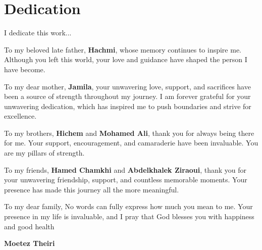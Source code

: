 \chapter*{Dedication }

\begin{center}

\begin{minipage}[c]{1\columnwidth}

{\large 
\vskip0.25cm

\centering

\begin{large}
I dedicate this work...

\vspace{0.5cm}

To my beloved late father, \textbf{Hachmi}, whose memory continues to inspire me. Although you left this world, your love and guidance have shaped the person I have become.

\vspace{0.5cm}

To my dear mother, \textbf{Jamila}, your unwavering love, support, and sacrifices have been a source of strength throughout my journey. I am forever grateful for your unwavering dedication, which has inspired me to push boundaries and strive for excellence.

\vspace{0.5cm}

To my brothers, \textbf{Hichem} and \textbf{Mohamed Ali}, thank you for always being there for me. Your support, encouragement, and camaraderie have been invaluable. You are my pillars of strength.

\vspace{0.5cm}

To my friends, \textbf{Hamed Chamkhi} and \textbf{Abdelkhalek Ziraoui}, thank you for your unwavering friendship, support, and countless memorable moments. Your presence has made this journey all the more meaningful.

\vspace{0.5cm}

To my dear family,
No words can fully express how much you mean to me. Your presence in my life is invaluable, and I pray that God blesses you with happiness and good health

\end{large}

}


\end{minipage}

\end{center}

\vskip1.5cm
\begin{flushright}\LARGE
\bf{Moetez Theiri}
\end{flushright}







